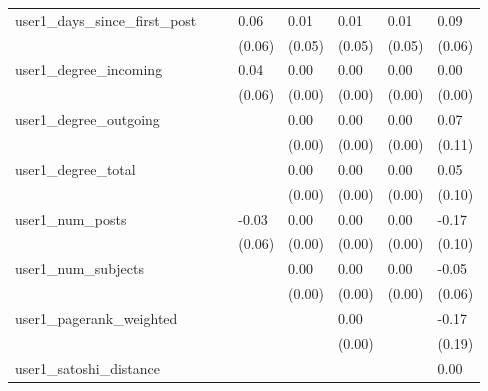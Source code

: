 \begin{table}
\begin{center}
\begin{tabular}{llllllll}
user1_days_since_first_post                      &          &            & 0.06    & 0.01    & 0.01         & 0.01               & 0.09      \\
                                                 &          &            & (0.06)  & (0.05)  & (0.05)       & (0.05)             & (0.06)    \\
user1_degree_incoming                            &          &            & 0.04    & 0.00    & 0.00         & 0.00               & 0.00      \\
                                                 &          &            & (0.06)  & (0.00)  & (0.00)       & (0.00)             & (0.00)    \\
user1_degree_outgoing                            &          &            &         & 0.00    & 0.00         & 0.00               & 0.07      \\
                                                 &          &            &         & (0.00)  & (0.00)       & (0.00)             & (0.11)    \\
user1_degree_total                               &          &            &         & 0.00    & 0.00         & 0.00               & 0.05      \\
                                                 &          &            &         & (0.00)  & (0.00)       & (0.00)             & (0.10)    \\
user1_num_posts                                  &          &            & -0.03   & 0.00    & 0.00         & 0.00               & -0.17     \\
                                                 &          &            & (0.06)  & (0.00)  & (0.00)       & (0.00)             & (0.10)    \\
user1_num_subjects                               &          &            &         & 0.00    & 0.00         & 0.00               & -0.05     \\
                                                 &          &            &         & (0.00)  & (0.00)       & (0.00)             & (0.06)    \\
user1_pagerank_weighted                          &          &            &         &         & 0.00         &                    & -0.17     \\
                                                 &          &            &         &         & (0.00)       &                    & (0.19)    \\
user1_satoshi_distance                           &          &            &         &         &              &                    & 0.00      \\

\end{tabular}
\end{center}
\end{table}
